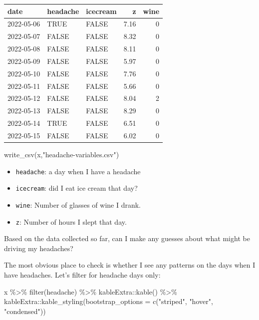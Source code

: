 \documentclass[
]{book}
\newenvironment{Shaded}{\begin{snugshade}}{\end{snugshade}}
\newcommand{\AttributeTok}[1]{\textcolor[rgb]{0.77,0.63,0.00}{#1}}
\newcommand{\FunctionTok}[1]{\textcolor[rgb]{0.00,0.00,0.00}{#1}}
\newcommand{\NormalTok}[1]{#1}
\newcommand{\SpecialCharTok}[1]{\textcolor[rgb]{0.00,0.00,0.00}{#1}}
\newcommand{\StringTok}[1]{\textcolor[rgb]{0.31,0.60,0.02}{#1}}
\providecommand{\tightlist}{%
  \setlength{\itemsep}{0pt}\setlength{\parskip}{0pt}}
\begin{document}
\begin{table}
\centering
\begin{tabular}{l|l|l|r|r}
\hline
date & headache & icecream & z & wine\\
\hline
2022-05-06 & TRUE & FALSE & 7.16 & 0\\
\hline
2022-05-07 & FALSE & FALSE & 8.32 & 0\\
\hline
2022-05-08 & FALSE & FALSE & 8.11 & 0\\
\hline
2022-05-09 & FALSE & FALSE & 5.97 & 0\\
\hline
2022-05-10 & FALSE & FALSE & 7.76 & 0\\
\hline
2022-05-11 & FALSE & FALSE & 5.66 & 0\\
\hline
2022-05-12 & FALSE & FALSE & 8.04 & 2\\
\hline
2022-05-13 & FALSE & FALSE & 8.29 & 0\\
\hline
2022-05-14 & TRUE & FALSE & 6.51 & 0\\
\hline
2022-05-15 & FALSE & FALSE & 6.02 & 0\\
\hline
\end{tabular}
\end{table}

\begin{Shaded}
\begin{Highlighting}[]
\FunctionTok{write\_csv}\NormalTok{(x,}\StringTok{"headache{-}variables.csv"}\NormalTok{)}
\end{Highlighting}
\end{Shaded}

\begin{itemize}
\tightlist
\item
  \texttt{headache}: a day when I have a headache
\item
  \texttt{icecream}: did I eat ice cream that day?
\item
  \texttt{wine}: Number of glasses of wine I drank.
\item
  \texttt{z}: Number of hours I slept that day.
\end{itemize}

Based on the data collected so far, can I make any guesses about what might be driving my headaches?

The most obvious place to check is whether I see any patterns on the days when I have headaches. Let's filter for headache days only:

\begin{Shaded}
\begin{Highlighting}[]
\NormalTok{x }\SpecialCharTok{\%\textgreater{}\%} \FunctionTok{filter}\NormalTok{(headache)  }\SpecialCharTok{\%\textgreater{}\%}\NormalTok{ kableExtra}\SpecialCharTok{::}\FunctionTok{kable}\NormalTok{() }\SpecialCharTok{\%\textgreater{}\%} 
\NormalTok{  kableExtra}\SpecialCharTok{::}\FunctionTok{kable\_styling}\NormalTok{(}\AttributeTok{bootstrap\_options =} \FunctionTok{c}\NormalTok{(}\StringTok{"striped"}\NormalTok{, }\StringTok{"hover"}\NormalTok{, }\StringTok{"condensed"}\NormalTok{))}
\end{Highlighting}
\end{Shaded}
\end{document}

